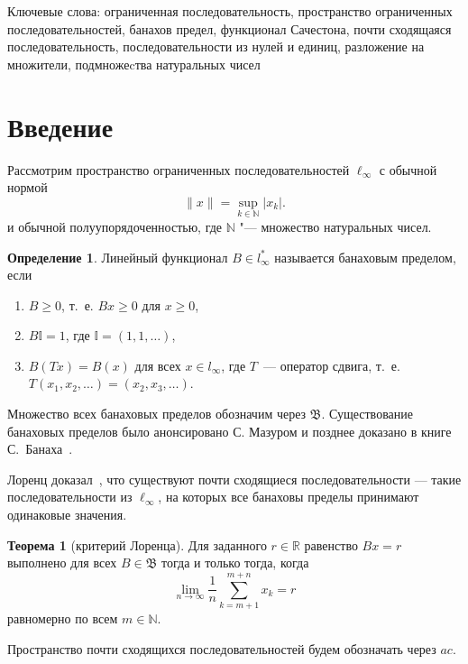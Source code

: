 \documentclass[a4paper,openbib]{article}
\renewcommand{\geq}{\geqslant} %
\theoremstyle{definition}
\newtheorem{theorem}[lemma]{Теорема}
\newtheorem{definition}[lemma]{Определение}
\begin{document}
Ключевые слова:
	ограниченная последовательность,
	пространство ограниченных последовательностей,
	банахов предел,
	функционал Сачестона,
	почти сходящаяся последовательность,
	последовательности из нулей и единиц,
	разложение на множители,
	подмножеcтва натуральных чисел


\section{Введение}

Рассмотрим пространство ограниченных последовательностей $\ell_\infty$ с обычной нормой
\begin{equation*}
	\|x\| = \sup_{k\in\mathbb{N}} |x_k|
	.
\end{equation*}
и обычной полуупорядоченностью, где $\mathbb{N}$ "--- множество натуральных чисел.


\begin{definition}
	Линейный функционал $B\in l_\infty^*$ называется банаховым пределом,
	если
	\begin{enumerate}
		\item
			$B\geq0$, т.~е. $Bx \geq 0$ для $x \geq 0$,
		\item
			$B\mathbb{I}=1$, где $\mathbb{I} =(1,1,\ldots)$,
		\item
			$B(Tx)=B(x)$ для всех $x\in l_\infty$, где $T$~---
		оператор сдвига, т.~е. $T(x_1,x_2,\ldots)=(x_2,x_3,\ldots)$.
	\end{enumerate}
\end{definition}
Множество всех банаховых пределов обозначим через $\mathfrak{B}$.
Существование банаховых пределов было анонсировано С. Мазуром \cite{Mazur} и позднее доказано в книге С.~Банаха~\cite{banach1993theorie}.

Лоренц доказал~\cite{lorentz1948contribution}, что существуют почти сходящиеся последовательности ---
такие последовательности из $\ell_\infty$,
на которых все банаховы пределы принимают одинаковые значения.
\begin{theorem}[критерий Лоренца]
	Для заданного $r\in\mathbb{R}$ равенство $Bx=r$ выполнено для всех $B\in\mathfrak{B}$
	тогда и только тогда, когда
	\begin{equation}
		\label{eq:crit_Lorentz}
		\lim_{n\to\infty} \frac{1}{n} \sum_{k=m+1}^{m+n} x_k = r
	\end{equation}
	равномерно по всем $m\in\mathbb{N}$.
\end{theorem}


Пространство почти сходящихся последовательностей будем обозначать через $ac$.
\end{document}
